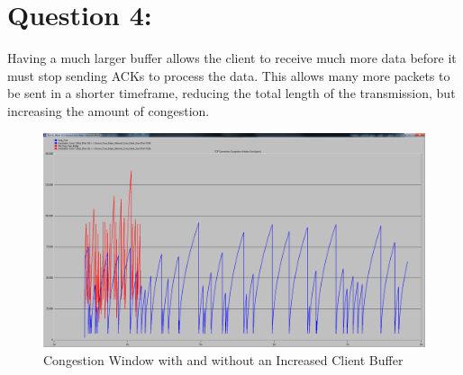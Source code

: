 \documentclass[letter,12pt]{article}
\begin{document}
\pagebreak

\section{Question 4:}
	Having a much larger buffer allows the client to receive much more data before it must stop sending ACKs to process the data.  This allows many more packets to be sent in a shorter timeframe, reducing the total length of the transmission, but increasing the amount of congestion.
	
	\begin{figure}[h!]
		\centering
			\includegraphics[width=.9\textwidth]{Congestion_Buffer.png}
		\caption{Congestion Window with and without an Increased Client Buffer}
		\label{Congestion_Buffer}
	\end{figure}
	
	
\end{document}

